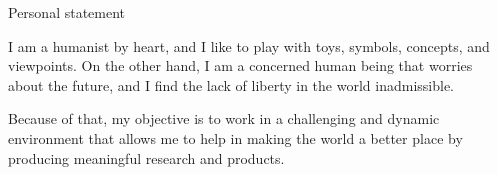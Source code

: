 \begin{rubric}{Personal statement}{

\entry*

I am a humanist by heart, and I like to play with toys, symbols,
concepts, and viewpoints. On the other hand, I am a concerned human
being that worries about the future, and I find the lack of liberty in
the world inadmissible.

  Because of that, my objective is to work in a challenging and
  dynamic environment that allows me to help in making the world a
  better place by producing meaningful research and products.  }
\end{rubric}
